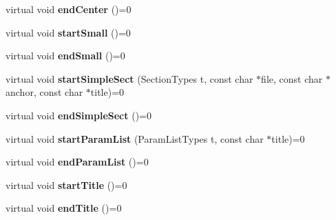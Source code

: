 \begin{DoxyCompactItemize}
\item 
\hypertarget{class_base_output_doc_interface_afb04dbc9e3cf3296af0295249e3105fe}{virtual void {\bfseries end\-Center} ()=0}\label{class_base_output_doc_interface_afb04dbc9e3cf3296af0295249e3105fe}

\item 
\hypertarget{class_base_output_doc_interface_a99a7175c105390ea2dcaf4236c096af2}{virtual void {\bfseries start\-Small} ()=0}\label{class_base_output_doc_interface_a99a7175c105390ea2dcaf4236c096af2}

\item 
\hypertarget{class_base_output_doc_interface_a6e1a25540f283ea2ca1a4747ae814079}{virtual void {\bfseries end\-Small} ()=0}\label{class_base_output_doc_interface_a6e1a25540f283ea2ca1a4747ae814079}

\item 
\hypertarget{class_base_output_doc_interface_a98bc450db49fb6704f072b3da99f10b2}{virtual void {\bfseries start\-Simple\-Sect} (Section\-Types t, const char $\ast$file, const char $\ast$anchor, const char $\ast$title)=0}\label{class_base_output_doc_interface_a98bc450db49fb6704f072b3da99f10b2}

\item 
\hypertarget{class_base_output_doc_interface_a0238efa13f3d7590b574327c52569cd9}{virtual void {\bfseries end\-Simple\-Sect} ()=0}\label{class_base_output_doc_interface_a0238efa13f3d7590b574327c52569cd9}

\item 
\hypertarget{class_base_output_doc_interface_a7ec21eff08cdb4e5c08f652f45f1fcfa}{virtual void {\bfseries start\-Param\-List} (Param\-List\-Types t, const char $\ast$title)=0}\label{class_base_output_doc_interface_a7ec21eff08cdb4e5c08f652f45f1fcfa}

\item 
\hypertarget{class_base_output_doc_interface_a69fd918e53c97523cbeca8313bd70fe7}{virtual void {\bfseries end\-Param\-List} ()=0}\label{class_base_output_doc_interface_a69fd918e53c97523cbeca8313bd70fe7}

\item 
\hypertarget{class_base_output_doc_interface_a341cbab81b0062f7958b87cf6a71d4d6}{virtual void {\bfseries start\-Title} ()=0}\label{class_base_output_doc_interface_a341cbab81b0062f7958b87cf6a71d4d6}

\item 
\hypertarget{class_base_output_doc_interface_aa3935ba65cff96b85083668a719528b5}{virtual void {\bfseries end\-Title} ()=0}\label{class_base_output_doc_interface_aa3935ba65cff96b85083668a719528b5}


\end{DoxyCompactItemize}
